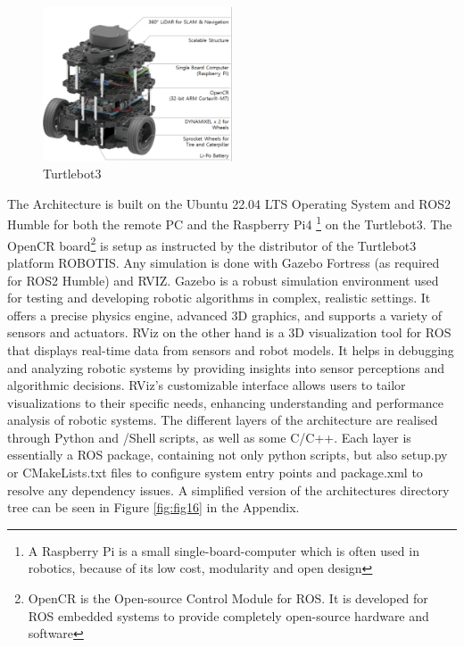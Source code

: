 \documentclass[%
paper=A4,               %
twoside=true,           %
openright,              %
11pt,                   %
bibliography=totoc,     %
titlepage=on,           %
DIV=12,                 %
BCOR=1.5cm,             %
parskip=half,            %
final
]{scrreprt}
\begin{document}
	\begin{figure}[ht]
		\centering
		\includegraphics[width=0.5\textwidth]{Graphics/Turtlebot3}
		\caption{Turtlebot3}
		\label{fig: fig7}
	\end{figure}
		
	 The Architecture is built on the Ubuntu 22.04 LTS Operating System and ROS2 Humble for both the remote PC and the Raspberry Pi4 \footnote{ A Raspberry Pi is a small single-board-computer which is often used in robotics, because of its low cost, modularity and open design} on the Turtlebot3. The OpenCR board\footnote{ OpenCR is the Open-source Control Module for ROS. It is developed for ROS embedded systems to provide completely open-source hardware and software} is setup as instructed by the distributor of the Turtlebot3 platform ROBOTIS.\autocite{robotisEmanualROBOTIS2024} \newline
	 Any simulation is done with Gazebo Fortress (as required for ROS2 Humble) and RVIZ. 
	 Gazebo is a robust simulation environment used for testing and developing robotic algorithms in complex, realistic settings. It offers a precise physics engine, advanced 3D graphics, and supports a variety of sensors and actuators. RViz on the other hand is a 3D visualization tool for ROS that displays real-time data from sensors and robot models. It helps in debugging and analyzing robotic systems by providing insights into sensor perceptions and algorithmic decisions. RViz's customizable interface allows users to tailor visualizations to their specific needs, enhancing understanding and performance analysis of robotic systems. 
	 The different layers of the architecture are realised through Python and /Shell scripts, as well as some C/C++.  Each layer is essentially a ROS package, containing not only python scripts, but also setup.py or CMakeLists.txt files to configure system entry points and package.xml to resolve any dependency issues. A simplified version of the architectures directory tree can be seen in Figure \ref{fig:fig16} in the Appendix.
	 
\end{document}
